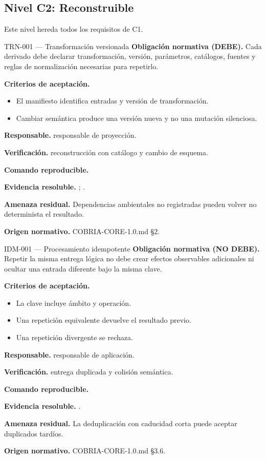 \subsection{Nivel C2: Reconstruible}
\label{nivel:c2}
Este nivel hereda todos los requisitos de C1.
\begin{requisito}{TRN-001 --- Transformación versionada}
\textbf{Obligación normativa (DEBE).} Cada derivado debe declarar transformación, versión, parámetros, catálogos, fuentes y reglas de normalización necesarias para repetirlo.\par
\textbf{Criterios de aceptación.}
\begin{itemize}
\item El manifiesto identifica entradas y versión de transformación.
\item Cambiar semántica produce una versión nueva y no una mutación silenciosa.
\end{itemize}
\textbf{Responsable.} responsable de proyección.\par
\textbf{Verificación.} reconstrucción con catálogo y cambio de esquema.\par
\textbf{Comando reproducible.} \texttt{}\par
\textbf{Evidencia resoluble.} ; .\par
\textbf{Amenaza residual.} Dependencias ambientales no registradas pueden volver no determinista el resultado.\par
\textbf{Origen normativo.} COBRIA-CORE-1.0.md §2.
\end{requisito}
\begin{requisito}{IDM-001 --- Procesamiento idempotente}
\textbf{Obligación normativa (NO DEBE).} Repetir la misma entrega lógica no debe crear efectos observables adicionales ni ocultar una entrada diferente bajo la misma clave.\par
\textbf{Criterios de aceptación.}
\begin{itemize}
\item La clave incluye ámbito y operación.
\item Una repetición equivalente devuelve el resultado previo.
\item Una repetición divergente se rechaza.
\end{itemize}
\textbf{Responsable.} responsable de aplicación.\par
\textbf{Verificación.} entrega duplicada y colisión semántica.\par
\textbf{Comando reproducible.} \texttt{}\par
\textbf{Evidencia resoluble.} .\par
\textbf{Amenaza residual.} La deduplicación con caducidad corta puede aceptar duplicados tardíos.\par
\textbf{Origen normativo.} COBRIA-CORE-1.0.md §3.6.
\end{requisito}
